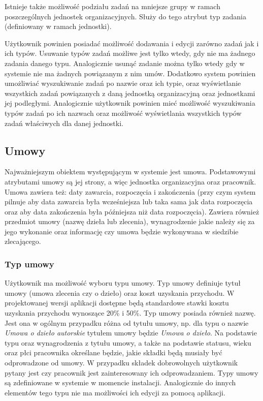 Istnieje także możliwość podziału zadań na mniejsze grupy w ramach poszczególnych jednostek organizacyjnych. Służy do tego atrybut typ zadania (definiowany w ramach jednostki).

Użytkownik powinien posiadać możliwość dodawania i edycji zarówno zadań jak i ich typów. Usuwanie typów zadań możliwe jest tylko wtedy, gdy nie ma żadnego zadania danego typu. Analogicznie usunąć zadanie można tylko wtedy gdy w systemie nie ma żadnych powiązanym z nim umów. Dodatkowo system powinien umożliwiać wyszukiwanie zadań po nazwie oraz ich typie, oraz wyświetlanie wszystkich zadań powiązanych z daną jednostką organizacyjną oraz jednostkami jej podległymi. Analogicznie użytkownik powinien mieć możliwość wyszukiwania typów zadań po ich nazwach oraz możliwość wyświetlania wszystkich typów zadań właściwych dla danej jednostki.

\subsection[Umowy][Umowy]{Umowy}
Najważniejszym obiektem występującym w systemie jest umowa. Podstawowymi atrybutami umowy są jej strony, a więc jednostka organizacyjna oraz pracownik. Umowa zawiera też: daty zawarcia, rozpoczęcia i zakończenia (przy czym system pilnuje aby data zawarcia była wcześniejsza lub taka sama jak data rozpoczęcia oraz aby data zakończenia była późniejsza niż data rozpoczęcia). Zawiera również przedmiot umowy (nazwę dzieła lub zlecenia), wynagrodzenie jakie należy się za jego wykonanie oraz informację czy umowa będzie wykonywana w siedzibie zlecającego. 

\subsubsection{Typ umowy}
Użytkownik ma możliwość wyboru typu umowy. Typ umowy definiuje tytuł umowy (umowa zlecenia czy o dzieło) oraz koszt uzyskania przychodu. W projektowanej wersji aplikacji dostępne będą standardowe stawki kosztu uzyskania przychodu wynoszące 20\% i 50\%. Typ umowy posiada również nazwę. Jest ona w ogólnym przypadku różna od tytułu umowy, np. dla typu o nazwie \textit{Umowa o dzieło autorskie} tytułem umowy będzie \textit{Umowa o dzieło}. Na podstawie typu oraz wynagrodzenia z tytułu umowy, a także na podstawie statusu, wieku oraz płci pracownika określane będzie, jakie składki będą musiały być odprowadzone od umowy. W przypadku składek dobrowolnych użytkownik pytany jest czy pracownik jest zainteresowany ich odprowadzaniem. Typy umowy są zdefiniowane w systemie w momencie instalacji. Analogicznie do innych elementów tego typu nie ma możliwości ich edycji za pomocą aplikacji.


